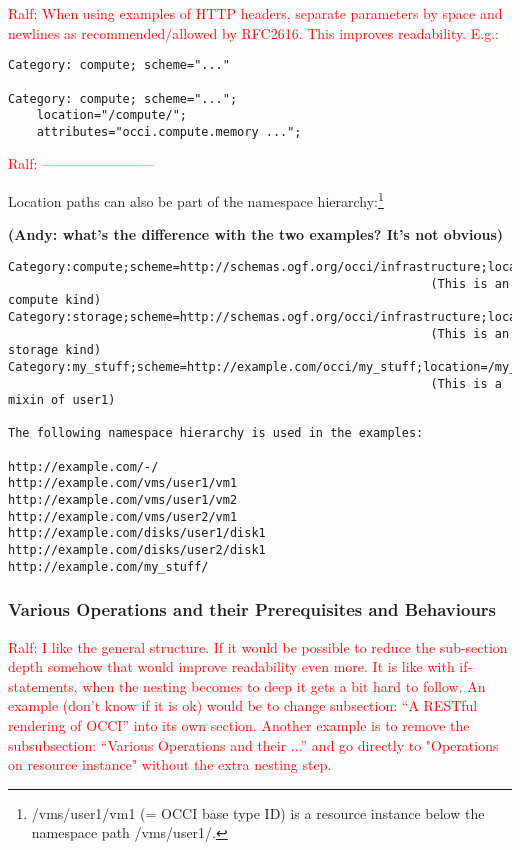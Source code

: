 \documentclass[10pt,a4paper]{article}
\newcommand{\ralf}[1]{\textcolor{red}{Ralf: #1}}
\begin{document}
\ralf{When using examples of HTTP headers, separate parameters by space and
newlines as recommended/allowed by RFC2616. This improves readability.
\newline
E.g.:}
\begin{verbatim}
Category: compute; scheme="..."

Category: compute; scheme="...";
    location="/compute/";
    attributes="occi.compute.memory ...";
\end{verbatim}
\ralf{------------------------}

Location paths can also be part of the namespace
hierarchy:\footnote{/vms/user1/vm1 (= OCCI base type ID) is a resource
  instance below the namespace path /vms/user1/.}

\textbf{(Andy: what's the difference with the two examples? It's not obvious)}

\begin{verbatim}
Category:compute;scheme=http://schemas.ogf.org/occi/infrastructure;location=/vms 
                                                           (This is an compute kind)
Category:storage;scheme=http://schemas.ogf.org/occi/infrastructure;location=/disks 
                                                           (This is an storage kind)
Category:my_stuff;scheme=http://example.com/occi/my_stuff;location=/my_stuff 
                                                           (This is a mixin of user1)

The following namespace hierarchy is used in the examples:

http://example.com/-/
http://example.com/vms/user1/vm1
http://example.com/vms/user1/vm2
http://example.com/vms/user2/vm1
http://example.com/disks/user1/disk1
http://example.com/disks/user2/disk1
http://example.com/my_stuff/
\end{verbatim}

\subsubsection{Various Operations and their Prerequisites and Behaviours}

\ralf{I like the general structure. If it would be possible to reduce the
sub-section depth somehow that would improve readability even more.  It is like
with if-statements, when the nesting becomes to deep it gets a bit hard to
follow.
\newline
An example (don't know if it is ok) would be to change subsection: ``A RESTful
rendering of OCCI'' into its own section.
\newline
Another example is to remove the subsubsection: ``Various Operations and their
...'' and go directly to "Operations on resource instance" without the extra
nesting step.
}
\end{document}
